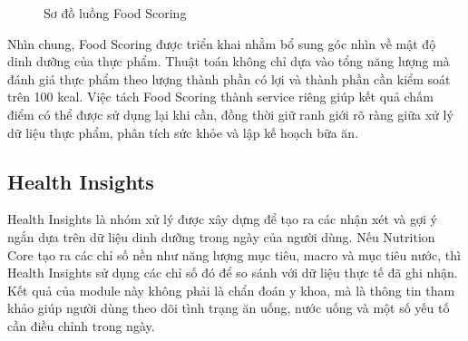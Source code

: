\documentclass[12pt, a4paper]{report}
\begin{document}
\begin{figure}[htbp]
    \centering
    \caption{Sơ đồ luồng Food Scoring}
    \label{fig:food_scoring_flow}
\end{figure}

Nhìn chung, Food Scoring được triển khai nhằm bổ sung góc nhìn về mật độ dinh dưỡng của thực phẩm. Thuật toán không chỉ dựa vào tổng năng lượng mà đánh giá thực phẩm theo lượng thành phần có lợi và thành phần cần kiểm soát trên 100 kcal. Việc tách Food Scoring thành service riêng giúp kết quả chấm điểm có thể được sử dụng lại khi cần, đồng thời giữ ranh giới rõ ràng giữa xử lý dữ liệu thực phẩm, phân tích sức khỏe và lập kế hoạch bữa ăn.
\subsection{Health Insights}Health Insights là nhóm xử lý được xây dựng để tạo ra các nhận xét và gợi ý ngắn dựa trên dữ liệu dinh dưỡng trong ngày của người dùng. Nếu Nutrition Core tạo ra các chỉ số nền như năng lượng mục tiêu, macro và mục tiêu nước, thì Health Insights sử dụng các chỉ số đó để so sánh với dữ liệu thực tế đã ghi nhận. Kết quả của module này không phải là chẩn đoán y khoa, mà là thông tin tham khảo giúp người dùng theo dõi tình trạng ăn uống, nước uống và một số yếu tố cần điều chỉnh trong ngày.
\end{document}
